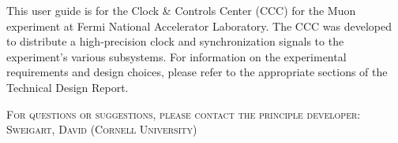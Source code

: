 This user guide is for the Clock \& Controls Center (CCC) for the Muon  experiment at Fermi National Accelerator Laboratory.  The CCC was developed to distribute a high-precision clock and synchronization signals to the experiment's various subsystems.  For information on the experimental requirements and design choices, please refer to the appropriate sections of the Technical Design Report.
\newline

\textsc{For questions or suggestions, please contact the principle developer:} \\
\newline
\textsc{
\medskip
\hspace*{1.0 cm} Sweigart, David (Cornell University)
}
